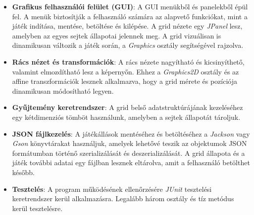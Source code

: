\documentclass[a4paper,12pt]{article}
\begin{document}
\begin{itemize}
    \item \textbf{Grafikus felhasználói felület (GUI)}: A GUI menükből és panelekből épül fel. A menük biztosítják a felhasználó számára az alapvető funkciókat, mint a játék indítása, mentése, betöltése és kilépése. A grid nézete egy \textit{JPanel} lesz, amelyben az egyes sejtek állapotai jelennek meg. A grid vizuálisan is dinamikusan változik a játék során, a \textit{Graphics} osztály segítségével rajzolva.
    
    \item \textbf{Rács nézet és transformációk}: A rács nézete nagyítható és kicsinyíthető, valamint elmozdítható lesz a képernyőn. Ehhez a \textit{Graphics2D} osztály és az affine transzformációk lesznek alkalmazva, hogy a grid mérete és pozíciója dinamikusan módosítható legyen.
    
    \item \textbf{Gyűjtemény keretrendszer}: A grid belső adatstruktúrájának kezeléséhez egy kétdimenziós tömböt használunk, amelyben a sejtek állapotát tároljuk.
    
    \item \textbf{JSON fájlkezelés}: A játékállások mentéséhez és betöltéséhez a \textit{Jackson} vagy \textit{Gson} könyvtárakat használjuk, amelyek lehetővé teszik az objektumok JSON formátumban történő szerializálását és deszerializálását. A grid állapota és a játék további adatai egy fájlban lesznek eltárolva, amit a felhasználó betölthet később.
    
    \item \textbf{Tesztelés}: A program működésének ellenőrzésére \textit{JUnit} tesztelési keretrendszer kerül alkalmazásra. Legalább három osztály és tíz metódus kerül tesztelésre.
\end{itemize}
\end{document}
